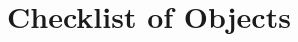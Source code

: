 \documentclass[a4paper,oneside]{book}
\begin{document}





\onecolumn

\chapter{Checklist of Objects}
\setlength{\marginparwidth}{0.1in}
\setlength{\marginparsep}{0in}
\setlength{\leftmargin}{-0.5in}
\end{document}
